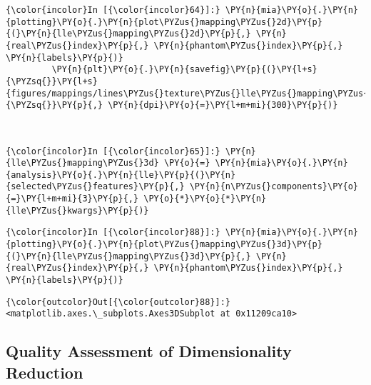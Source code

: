     \begin{Verbatim}[commandchars=\\\{\}]
{\color{incolor}In [{\color{incolor}64}]:} \PY{n}{mia}\PY{o}{.}\PY{n}{plotting}\PY{o}{.}\PY{n}{plot\PYZus{}mapping\PYZus{}2d}\PY{p}{(}\PY{n}{lle\PYZus{}mapping\PYZus{}2d}\PY{p}{,} \PY{n}{real\PYZus{}index}\PY{p}{,} \PY{n}{phantom\PYZus{}index}\PY{p}{,} \PY{n}{labels}\PY{p}{)}
         \PY{n}{plt}\PY{o}{.}\PY{n}{savefig}\PY{p}{(}\PY{l+s}{\PYZsq{}}\PY{l+s}{figures/mappings/lines\PYZus{}texture\PYZus{}lle\PYZus{}mapping\PYZus{}2d.png}\PY{l+s}{\PYZsq{}}\PY{p}{,} \PY{n}{dpi}\PY{o}{=}\PY{l+m+mi}{300}\PY{p}{)}
\end{Verbatim}

    \begin{center}
    \end{center}
    { \hspace*{\fill} \\}

    \begin{Verbatim}[commandchars=\\\{\}]
{\color{incolor}In [{\color{incolor}65}]:} \PY{n}{lle\PYZus{}mapping\PYZus{}3d} \PY{o}{=} \PY{n}{mia}\PY{o}{.}\PY{n}{analysis}\PY{o}{.}\PY{n}{lle}\PY{p}{(}\PY{n}{selected\PYZus{}features}\PY{p}{,} \PY{n}{n\PYZus{}components}\PY{o}{=}\PY{l+m+mi}{3}\PY{p}{,} \PY{o}{*}\PY{o}{*}\PY{n}{lle\PYZus{}kwargs}\PY{p}{)}
\end{Verbatim}

    \begin{Verbatim}[commandchars=\\\{\}]
{\color{incolor}In [{\color{incolor}88}]:} \PY{n}{mia}\PY{o}{.}\PY{n}{plotting}\PY{o}{.}\PY{n}{plot\PYZus{}mapping\PYZus{}3d}\PY{p}{(}\PY{n}{lle\PYZus{}mapping\PYZus{}3d}\PY{p}{,} \PY{n}{real\PYZus{}index}\PY{p}{,} \PY{n}{phantom\PYZus{}index}\PY{p}{,} \PY{n}{labels}\PY{p}{)}
\end{Verbatim}

            \begin{Verbatim}[commandchars=\\\{\}]
{\color{outcolor}Out[{\color{outcolor}88}]:} <matplotlib.axes.\_subplots.Axes3DSubplot at 0x11209ca10>
\end{Verbatim}

    \subsection{Quality Assessment of Dimensionality
Reduction}\label{quality-assessment-of-dimensionality-reduction}

